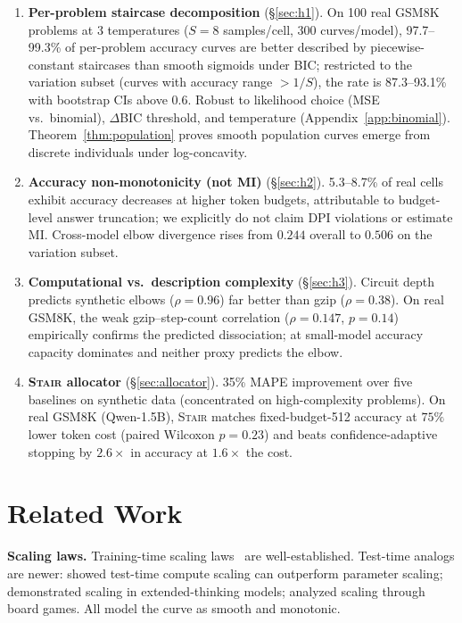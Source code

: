 \documentclass{article}
\newcommand{\method}{\textsc{Stair}}
\begin{document}
\begin{enumerate}[leftmargin=*,itemsep=1pt]
    \item \textbf{Per-problem staircase decomposition} (\S\ref{sec:h1}).  On 100 real GSM8K problems at 3 temperatures ($S{=}8$ samples/cell, 300 curves/model), 97.7--99.3\% of per-problem accuracy curves are better described by piecewise-constant staircases than smooth sigmoids under BIC; restricted to the variation subset (curves with accuracy range $> 1/S$), the rate is 87.3--93.1\% with bootstrap CIs above $0.6$.  Robust to likelihood choice (MSE vs.\ binomial), $\Delta$BIC threshold, and temperature (Appendix~\ref{app:binomial}).  Theorem~\ref{thm:population} proves smooth population curves emerge from discrete individuals under log-concavity.
    \item \textbf{Accuracy non-monotonicity (not MI)} (\S\ref{sec:h2}).  5.3--8.7\% of real cells exhibit accuracy decreases at higher token budgets, attributable to budget-level answer truncation; we explicitly do not claim DPI violations or estimate MI.  Cross-model elbow divergence rises from $0.244$ overall to $0.506$ on the variation subset.
    \item \textbf{Computational vs.\ description complexity} (\S\ref{sec:h3}).  Circuit depth predicts synthetic elbows ($\rho{=}0.96$) far better than gzip ($\rho{=}0.38$).  On real GSM8K, the weak gzip--step-count correlation ($\rho{=}0.147$, $p{=}0.14$) empirically confirms the predicted dissociation; at small-model accuracy capacity dominates and neither proxy predicts the elbow.
    \item \textbf{\method{} allocator} (\S\ref{sec:allocator}).  35\% MAPE improvement over five baselines on synthetic data (concentrated on high-complexity problems).  On real GSM8K (Qwen-1.5B), \method{} matches fixed-budget-512 accuracy at $75\%$ lower token cost (paired Wilcoxon $p{=}0.23$) and beats confidence-adaptive stopping by $2.6\times$ in accuracy at $1.6\times$ the cost.
\end{enumerate}

\section{Related Work}
\label{sec:related}

\textbf{Scaling laws.}  Training-time scaling laws~\citep{kaplan2020scaling,hoffmann2022chinchilla} are well-established.  Test-time analogs are newer: \citet{snell2024scaling} showed test-time compute scaling can outperform parameter scaling; \citet{brown2024scaling} demonstrated scaling in extended-thinking models; \citet{jones2021scaling} analyzed scaling through board games.  All model the curve as smooth and monotonic.
\end{document}
